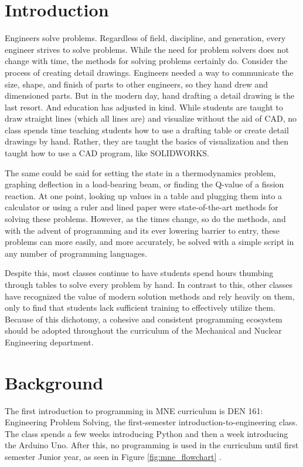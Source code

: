 \section{Introduction}

Engineers solve problems. Regardless of field, discipline, and generation, every engineer
strives to solve problems. While the need for problem solvers does not change with time,
the methods for solving problems certainly do. Consider the process of creating detail 
drawings. Engineers needed a way to communicate the size, shape, and finish of parts to 
other engineers, so they hand drew and dimensioned parts. But in the modern day, 
hand drafting a detail drawing is the last resort. And education has adjusted in
kind. While students are taught to draw straight lines (which all lines are) and visualize
without the aid of CAD, no class spends time teaching students how to use a drafting table
or create detail drawings by hand. Rather, they are taught the basics of visualization
and then taught how to use a CAD program, like SOLIDWORKS.

The same could be said for setting the state in a thermodynamics problem, graphing
deflection in a load-bearing beam, or finding the Q-value of a fission reaction. At one
point, looking up values in a table and plugging them into a calculator or using a ruler
and lined paper were state-of-the-art methods for solving these problems. However, as the 
times change, so do the methods, and with the advent of programming and its ever lowering 
barrier to entry, these problems can more easily, and more accurately, be solved with a 
simple script in any number of programming languages.

Despite this, most classes continue to have students spend hours thumbing through tables
to solve every problem by hand. In contrast to this, other classes have recognized the
value of modern solution methods and rely heavily on them, only to find that students
lack sufficient training to effectively utilize them. Because of this dichotomy, a cohesive 
and consistent programming ecosystem should be adopted throughout the curriculum 
of the Mechanical and Nuclear Engineering department.


\section{Background}

The first introduction to programming in MNE curriculum is DEN 161: Engineering Problem Solving,
the first-semester introduction-to-engineering class. The class spends a few weeks introducing
Python and then a week introducing the Arduino Uno. After this, no programming is used in the
curriculum until first semester Junior year, as seen in Figure \ref{fig:mne_flowchart}
\cite{flowchart2022}. 


